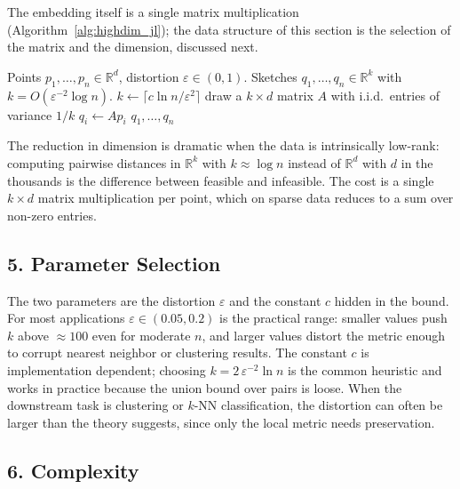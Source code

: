 The embedding itself is a single matrix multiplication
(Algorithm~\ref{alg:highdim_jl}); the data structure of this section is the
selection of the matrix and the dimension, discussed next.

\begin{algorithm}[htbp]
\caption{Johnson--Lindenstrauss Embedding}
\label{alg:highdim_jl}
\begin{algorithmic}[1]
\Require Points $p_1, \dots, p_n \in \mathbb{R}^d$, distortion $\varepsilon \in (0,1)$.
\Ensure Sketches $q_1, \dots, q_n \in \mathbb{R}^k$ with $k = O(\varepsilon^{-2} \log n)$.
  \State $k \gets \lceil c \ln n / \varepsilon^2 \rceil$ 
  \State draw a $k \times d$ matrix $A$ with i.i.d.\ entries of variance $1/k$
    \State $q_i \gets A p_i$
  \EndFor
  \State \Return $q_1, \dots, q_n$
\EndFunction
\end{algorithmic}
\end{algorithm}

The reduction in dimension is dramatic when the data is intrinsically
low-rank: computing pairwise distances in $\mathbb{R}^k$ with
$k \approx \log n$ instead of $\mathbb{R}^d$ with $d$ in the thousands is the
difference between feasible and infeasible. The cost is a single
$k \times d$ matrix multiplication per point, which on sparse data reduces to
a sum over non-zero entries.

\subsection{5. Parameter Selection}

The two parameters are the distortion $\varepsilon$ and the constant
$c$ hidden in the bound. For most applications $\varepsilon \in (0.05, 0.2)$
is the practical range: smaller values push $k$ above $\approx 100$ even for
moderate $n$, and larger values distort the metric enough to corrupt nearest
neighbor or clustering results. The constant $c$ is implementation dependent;
choosing $k = 2\,\varepsilon^{-2}\ln n$ is the common heuristic and works in
practice because the union bound over pairs is loose. When the downstream task
is clustering or $k$-NN classification, the distortion can often be larger
than the theory suggests, since only the local metric needs preservation.

\subsection{6. Complexity}

